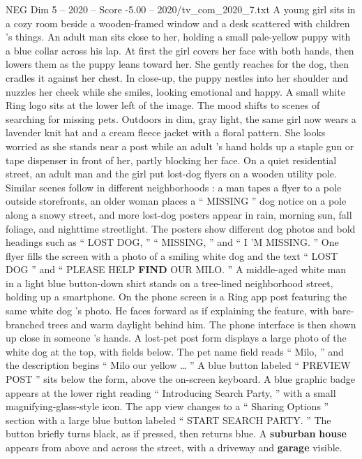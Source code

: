 \begin{textsample}{NEG Dim 5 – 2020 – Score -5.00 – 2020/tv\_com\_2020\_7.txt}  \label{ex:f5_neg_032}
A young girl sits in a cozy room beside a wooden-framed window and a desk scattered with children ’s things.
An adult man sits close to her, holding a small pale-yellow puppy with a blue collar across his lap.
At first the girl covers her face with both hands, then lowers them as the puppy leans toward her.
She gently reaches for the dog, then cradles it against her chest.
In close-up, the puppy nestles into her shoulder and nuzzles her cheek while she smiles, looking emotional and happy.
A small white Ring logo sits at the lower left of the image.
The mood shifts to scenes of searching for missing pets.
Outdoors in dim, gray light, the same girl now wears a lavender knit hat and a cream fleece jacket with a floral pattern.
She looks worried as she stands near a post while an adult ’s hand holds up a staple gun or tape dispenser in front of her, partly blocking her face.
On a quiet residential street, an adult man and the girl put lost-dog flyers on a wooden utility pole.
Similar scenes follow in different neighborhoods : a man tapes a flyer to a pole outside storefronts, an older woman places a “ MISSING ” dog notice on a pole along a snowy street, and more lost-dog posters appear in rain, morning sun, fall foliage, and nighttime streetlight.
The posters show different dog photos and bold headings such as “ LOST DOG, ” “ MISSING, ” and “ I ’M MISSING. ” One flyer fills the screen with a photo of a smiling white dog and the text “ LOST DOG ” and “ PLEASE HELP \textbf{FIND} OUR MILO. ” A middle-aged white man in a light blue button-down shirt stands on a tree-lined neighborhood street, holding up a smartphone.
On the phone screen is a Ring app post featuring the same white dog ’s photo.
He faces forward as if explaining the feature, with bare-branched trees and warm daylight behind him.
The phone interface is then shown up close in someone ’s hands.
A lost-pet post form displays a large photo of the white dog at the top, with fields below.
The pet name field reads “ Milo, ” and the description begins “ Milo our yellow … ” A blue button labeled “ PREVIEW POST ” sits below the form, above the on-screen keyboard.
A blue graphic badge appears at the lower right reading “ Introducing Search Party, ” with a small magnifying-glass-style icon.
The app view changes to a “ Sharing Options ” section with a large blue button labeled “ START SEARCH PARTY. ” The button briefly turns black, as if pressed, then returns blue.
A \textbf{suburban} \textbf{house} appears from above and across the street, with a driveway and \textbf{garage} visible.

\end{textsample}
